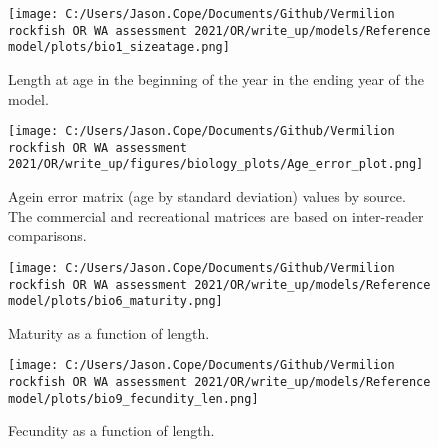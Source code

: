 \documentclass[11pt,
  english,
  a4paper,
]{article}
\begin{document}
\tagmcend\tagstructend


\begin{figure}
\centering
\texttt{[image: C:/Users/Jason.Cope/Documents/Github/Vermilion rockfish OR WA assessment 2021/OR/write\_up/models/Reference model/plots/bio1\_sizeatage.png]}
\caption{Length at age in the beginning of the year in the ending year of the model.\label{fig:len-age-ss}}
\end{figure}

\tagmcend\tagstructend


\begin{figure}
\centering
\texttt{[image: C:/Users/Jason.Cope/Documents/Github/Vermilion rockfish OR WA assessment 2021/OR/write\_up/figures/biology\_plots/Age\_error\_plot.png]}
\caption{Agein error matrix (age by standard deviation) values by source. The commercial and recreational matrices are based on inter-reader comparisons.\label{fig:age-error}}
\end{figure}

\tagmcend\tagstructend


\begin{figure}
\centering
\texttt{[image: C:/Users/Jason.Cope/Documents/Github/Vermilion rockfish OR WA assessment 2021/OR/write\_up/models/Reference model/plots/bio6\_maturity.png]}
\caption{Maturity as a function of length.\label{fig:maturity}}
\end{figure}

\tagmcend\tagstructend


\begin{figure}
\centering
\texttt{[image: C:/Users/Jason.Cope/Documents/Github/Vermilion rockfish OR WA assessment 2021/OR/write\_up/models/Reference model/plots/bio9\_fecundity\_len.png]}
\caption{Fecundity as a function of length.\label{fig:fecundity}}
\end{figure}
\end{document}
